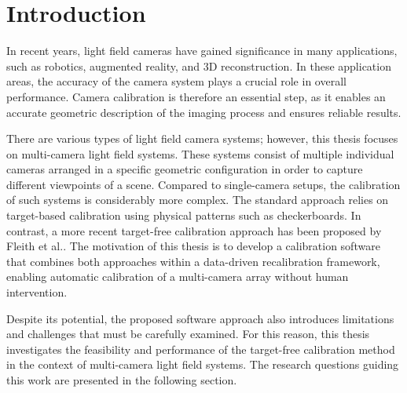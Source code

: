 \documentclass[12pt]{scrartcl}
\begin{document}
\cleardoublepage

\tableofcontents
\clearpage

\listoffigures
\listoftables
\clearpage


\section{Introduction}

In recent years, light field cameras have gained significance in many applications, such as robotics, augmented reality, and 3D reconstruction. In these application areas, the accuracy of the camera system plays a crucial role in overall performance. Camera calibration is therefore an essential step, as it enables an accurate geometric description of the imaging process and ensures reliable results.
\newline

There are various types of light field camera systems; however, this thesis focuses on multi-camera light field systems. These systems consist of multiple individual cameras arranged in a specific geometric configuration in order to capture different viewpoints of a scene. Compared to single-camera setups, the calibration of such systems is considerably more complex. The standard approach relies on target-based calibration using physical patterns such as checkerboards. In contrast, a more recent target-free calibration approach has been proposed by Fleith et al.\cite{LiFCal}. The motivation of this thesis is to develop a calibration software that combines both approaches within a data-driven recalibration framework, enabling automatic calibration of a multi-camera array without human intervention.
\newline

Despite its potential, the proposed software approach also introduces limitations and challenges that must be carefully examined. For this reason, this thesis investigates the feasibility and performance of the target-free calibration method in the context of multi-camera light field systems. The research questions guiding this work are presented in the following section.
\end{document}
